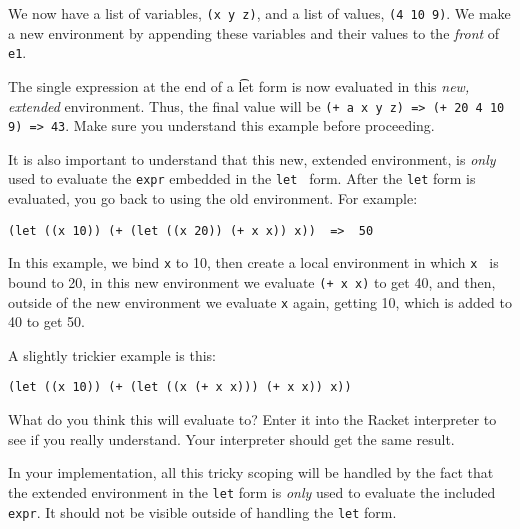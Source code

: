 \documentclass{article}
\begin{document}
We now have a list of variables, {\tt (x y z)}, and a list of values,
{\tt (4 10 9)}.  We make a new environment by appending these
variables and their values to the {\em front} of {\tt e1}.

The single expression at the end of a {\t let} form is now evaluated
in this {\em new, extended} environment.  Thus, the final value will
be  {\tt (+ a x y z) => (+ 20 4 10 9) => 43}.  Make sure you
understand this example before proceeding.

It is also important to understand that this new, extended
environment, is {\em only } used to evaluate the {\tt expr} embedded
in the {\tt let } form.  After the {\tt let} form is evaluated, you go
back to using the old environment.  For example:
\begin{Verbatim}[frame=single]
  (let ((x 10)) (+ (let ((x 20)) (+ x x)) x))  =>  50
\end{Verbatim}
    In this
example, we bind {\tt x} to 10, then create a local environment in
which {\tt x } is bound to 20, in this new environment we evaluate
{\tt (+ x x)} to get 40, and then, outside of the new environment we
evaluate {\tt x} again, getting 10, which is added to 40 to get 50.

A slightly trickier example is this:
\begin{Verbatim}[frame=single]
  (let ((x 10)) (+ (let ((x (+ x x))) (+ x x)) x))
\end{Verbatim}
  What do you
think this will evaluate to?  Enter it into the Racket interpreter to
see if you really understand.  Your interpreter should get the same
result. 

In your implementation, all this tricky scoping will be handled by the
fact that the extended environment in the {\tt let} form is {\em only}
used to evaluate the included {\tt expr}.  It should not be visible
outside of handling the {\tt let} form.
\end{document}
